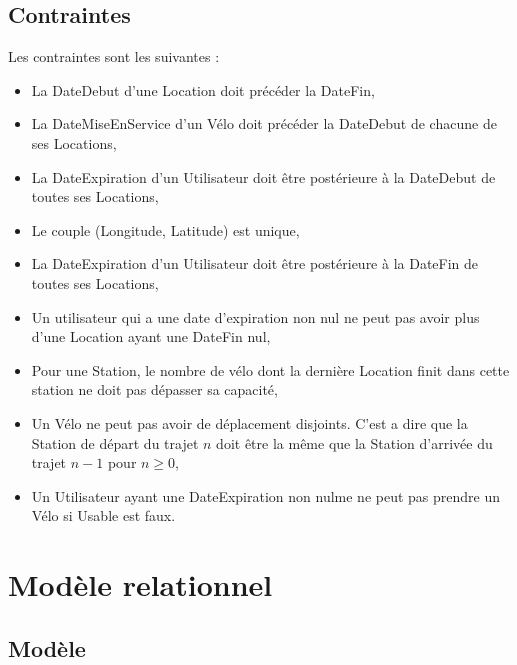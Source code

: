 \documentclass[a4paper,10pt]{article}
\begin{document}
\subsection{Contraintes}
Les contraintes sont les suivantes :
\begin{itemize}
  \item La DateDebut d'une Location doit précéder la DateFin, 
  \item La DateMiseEnService d'un Vélo doit précéder la DateDebut de chacune de ses Locations,
  \item La DateExpiration d'un Utilisateur doit \^etre postérieure à la DateDebut de toutes ses Locations,
  \item Le couple (Longitude, Latitude) est unique,
  \item La DateExpiration d'un Utilisateur doit \^etre postérieure à la DateFin de toutes ses Locations,
  \item Un utilisateur qui a une date d'expiration non nul ne peut pas avoir plus d'une Location ayant une DateFin nul,
  \item Pour une Station, le nombre de vélo dont la dernière Location finit  dans cette station ne doit pas dépasser sa capacité,
  \item Un Vélo ne peut pas avoir de déplacement disjoints. C'est a dire que la Station de départ du trajet $n$ doit \^etre la même que la Station d'arrivée du trajet $n-1$ pour $n\ge0$,
  \item Un Utilisateur ayant une DateExpiration non nulme ne peut pas prendre un Vélo si Usable est faux.
\end{itemize}



\section{Modèle relationnel}
\subsection{Modèle}
\end{document}
